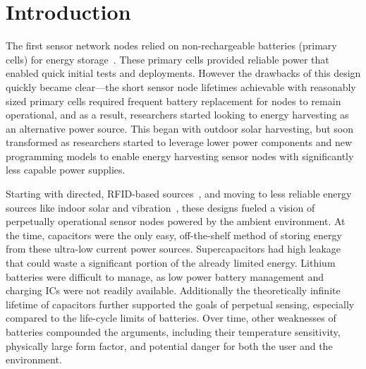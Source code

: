 \section{Introduction}
\label{sec:intro}

%

The first sensor network nodes relied on non-rechargeable batteries
(primary cells) for energy storage~\cite{mainwaring2002wireless, polastre2005telos}. These primary
cells provided reliable power that enabled quick
initial
tests and deployments. However the drawbacks of this design quickly became
clear---the short sensor node
lifetimes achievable with reasonably sized primary cells required frequent
battery replacement for nodes to remain operational, and as a result, researchers
started looking to energy harvesting as an alternative power source. This began
with outdoor solar harvesting, but soon transformed as researchers
started to leverage lower power components and new
programming models to enable energy harvesting
sensor nodes with significantly less capable power supplies.

Starting with directed, RFID-based sources~\cite{smithWirelessly06}, and moving
to less reliable energy sources like indoor solar and vibration~\cite{gorlatovaPrototyping10, yervaGrafting12, campbellEnergy14},
these designs fueled a vision of perpetually
operational sensor nodes powered by the ambient environment.
At the time, capacitors were the only easy, off-the-shelf method
of storing energy from these ultra-low current power sources.
Supercapacitors had high leakage that could waste a significant portion
of the already limited energy.
Lithium batteries were difficult to manage, as low power battery
management and charging ICs were not readily available.
Additionally
the theoretically infinite lifetime of
capacitors further supported the goals of perpetual sensing, especially
compared to the life-cycle limits of batteries. Over time, other weaknesses of
batteries compounded the arguments, including their temperature sensitivity,
physically large form factor, and potential danger for both the user and
the environment.


